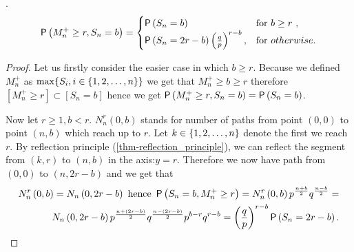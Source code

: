 \begin{thm}\label{thm-probability_maximum_upto_time}
 \Lrw.
 \[
 \operatorname{\mathsf{P}} \left(  M_n^+\geq r, S_n=b \right) =
 \begin{cases}
 \operatorname{\mathsf{P}} \left( S_n=b \right) & \text{for $b \geq r$ },\\
 \operatorname{\mathsf{P}} \left( S_n=2r-b \right) \left( \frac{q}{p} \right) ^{r-b}, & \text{for $otherwise$}.
 \end{cases}
 \]
\end{thm}
\begin{proof}
 Let us firstly consider the easier case in which $b \geq r$. Because we defined $ M_n^+$ as $\max \{S_i, i\in \{1,2,\ldots, n\} \}$ we get that $ M_n^+ \geq b \geq r$
 therefore $[ M_n^+ \geq r] \subset [S_n=b]$ hence we get $\operatorname{\mathsf{P}} \left(  M_n^+\geq r, S_n=b \right) =
 \operatorname{\mathsf{P}} \left( S_n=b \right)$.

 Now let $r\geq 1, b<r$. $N_n^r \left( 0,b \right) $ stands for number of paths from point $ \left( 0,0 \right) $ to point $ \left( n,b \right) $ which reach up to $r$.
 Let $k \in \{1,2,\ldots, n\}$ denote the first \Time we reach $r$. By reflection principle (\ref{thm-reflection_principle}), we can reflect the segment from $\left(k,r\right)$ to $ \left( n,b \right) $ in the axis:$y=r$.
 Therefore we now have path from $ \left( 0,0 \right) $ to $ \left( n,2r-b \right) $
 and we get that
 \[
 \begin{split}
  N_n^r \left( 0,b \right) =N_n \left( 0,2r-b \right) \text{ hence } \operatorname{\mathsf{P}} \left( S_n=b, M_n^+\geq r \right)
 =N_n^r \left( 0,b \right) p^{\frac{n+b}{2}}q^{\frac{n-b}{2}}=\\
 N_n \left( 0,2r-b \right) p^{\frac{n+ \left( 2r-b \right) }{2}}q^{\frac{n- \left( 2r-b \right) }{2}}p^{b-r}q^{r-b}= \left( \frac{q}{p} \right) ^{r-b}\operatorname{\mathsf{P}} \left( S_n=2r-b \right).
\end{split}
 \]
\end{proof}

